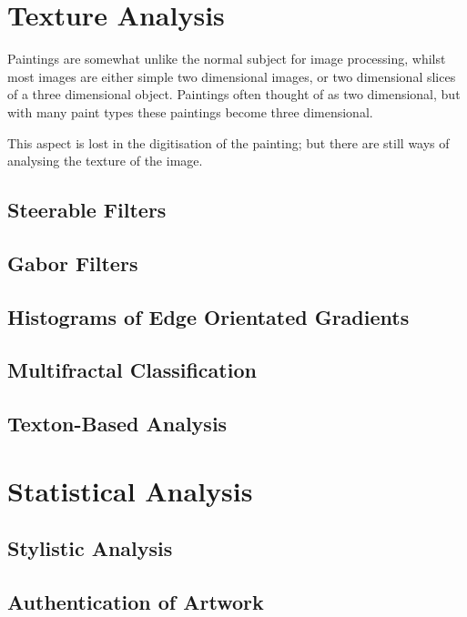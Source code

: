 \documentclass[conference]{IEEEtran}
\begin{document}
\section{Texture Analysis}
Paintings are somewhat unlike the normal subject for image processing, whilst
most images are either simple two dimensional images, or two dimensional slices
of a three dimensional object. Paintings often thought of as two dimensional,
but with many paint types these paintings become three dimensional.

This aspect is lost in the digitisation of the painting; but there are still
ways of analysing the texture of the image.

\subsection{Steerable Filters}

\subsection{Gabor Filters}

\subsection{Histograms of Edge Orientated Gradients}

\subsection{Multifractal Classification}

\subsection{Texton-Based Analysis}

\section{Statistical Analysis}

\subsection{Stylistic Analysis}

\subsection{Authentication of Artwork}
\end{document}
